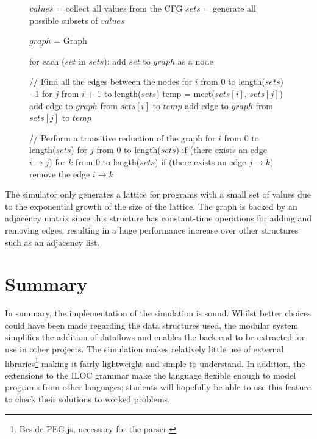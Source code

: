 \documentclass[bsc,twoside,singlespacing,parskip,logo,notimes,normalheadings]{infthesis}
\begin{document}
        \begin{figure}[!ht]
        \begin{algorithm}[caption={Constructing a \gls{hassediagram} for the \gls{meetsemilattice} of a \gls{cfg}.}, label={algo:lattice_construction},mathescape=true]
$values$ = collect all values from the CFG
$sets$ = generate all possible subsets of $values$

$graph$ = Graph

for each ($set$ in $sets$):
    add $set$ to $graph$ as a node

// Find all the edges between the nodes
for $i$ from 0 to length($sets$) - 1
    for $j$ from $i$ + 1 to length($sets$)
        temp = meet($sets[i]$, $sets[j]$)
        add edge to $graph$ from $sets[i]$ to $temp$
        add edge to $graph$ from $sets[j]$ to $temp$

// Perform a transitive reduction of the graph
for $i$ from 0 to length($sets$)
    for $j$ from 0 to length($sets$)
        if (there exists an edge $i \rightarrow j$)
            for $k$ from 0 to length($sets$)
                if (there exists an edge $j \rightarrow k$)
                    remove the edge $i \rightarrow k$
        \end{algorithm}
        \end{figure}

        The simulator only generates a lattice for programs with a
        small set of values due to the exponential growth of the size
        of the lattice. The graph is backed by an adjacency matrix
        since this structure has constant-time operations for adding
        and removing edges, resulting in a huge performance increase
        over other structures such as an adjacency list.

        \section{Summary}
        In summary, the implementation of the simulation is
        sound. Whilst better choices could have been made regarding
        the data structures used, the modular system simplifies the
        addition of \gls{dataflow}s and enables the back-end to be
        extracted for use in other projects. The simulation makes
        relatively little use of external libraries\footnote{Beside
          PEG.js, necessary for the parser.} making it fairly
        lightweight and simple to understand. In addition, the
        extensions to the ILOC grammar make the language flexible
        enough to model programs from other languages; students will
        hopefully be able to use this feature to check their solutions
        to worked problems.
\end{document}
